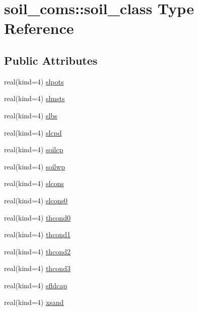 \hypertarget{structsoil__coms_1_1soil__class}{}\section{soil\+\_\+coms\+:\+:soil\+\_\+class Type Reference}
\label{structsoil__coms_1_1soil__class}
\subsection*{Public Attributes}
\begin{DoxyCompactItemize}
\item 
real(kind=4) \hyperlink{structsoil__coms_1_1soil__class_abfc4e2446c304449858363b094e2344d}{slpots}
\item 
real(kind=4) \hyperlink{structsoil__coms_1_1soil__class_a56f2701c2652957a05492b9d1291796f}{slmsts}
\item 
real(kind=4) \hyperlink{structsoil__coms_1_1soil__class_a1bcc476131afca1213f8fc38876ed266}{slbs}
\item 
real(kind=4) \hyperlink{structsoil__coms_1_1soil__class_ab17bdd369f299563eb109466cf3b4599}{slcpd}
\item 
real(kind=4) \hyperlink{structsoil__coms_1_1soil__class_ac8d254f86a3686ef8a48a473931020e3}{soilcp}
\item 
real(kind=4) \hyperlink{structsoil__coms_1_1soil__class_a417d48eb2c1c9d9c678c9225985a68d6}{soilwp}
\item 
real(kind=4) \hyperlink{structsoil__coms_1_1soil__class_a76abb6daef7e23e97b4dd12937c54f58}{slcons}
\item 
real(kind=4) \hyperlink{structsoil__coms_1_1soil__class_a9172c6cc1989a009ae5a6dd762e9166b}{slcons0}
\item 
real(kind=4) \hyperlink{structsoil__coms_1_1soil__class_a34b89fa4a50d1b524ccedbe54196099a}{thcond0}
\item 
real(kind=4) \hyperlink{structsoil__coms_1_1soil__class_aecf387fb43147f44f15579a90ffaed15}{thcond1}
\item 
real(kind=4) \hyperlink{structsoil__coms_1_1soil__class_a04972c5a3f38ad30d5b81c741ff6d420}{thcond2}
\item 
real(kind=4) \hyperlink{structsoil__coms_1_1soil__class_a397cf750d8da66afa2bbe2852710fb96}{thcond3}
\item 
real(kind=4) \hyperlink{structsoil__coms_1_1soil__class_afc91c8dce6fabd9a9281cc5d08e4aa76}{sfldcap}
\item 
real(kind=4) \hyperlink{structsoil__coms_1_1soil__class_a3dec357296a1dd2bc95b3e0561048c9f}{xsand}

\end{DoxyCompactItemize}
